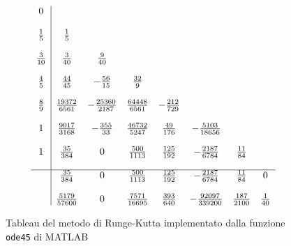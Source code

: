 \begin{figure}[htb]
$$\begin{array}{c|ccccccc}
0					&									&									&									&								&											&						&		\\ \\
\frac{1}{5}	&	\frac{1}{5}				&									&									&								&											&						&		\\ \\
\frac{3}{10}	&	\frac{3}{40}				&	\frac{9}{40}				&									&								&											&						&		\\ \\
\frac{4}{5}	&	\frac{44}{45}			&	-\frac{56}{15}			&	\frac{32}{9}				&								&											&						&		\\ \\
\frac{8}{9}	&	\frac{19372}{6561}	&	-\frac{25360}{2187}&	\frac{64448}{6561}	&	-\frac{212}{729}	&											&						&		\\ \\
1					&	\frac{9017}{3168}	&	-\frac{355}{33}		&	\frac{46732}{5247}	&	\frac{49}{176}		&	-\frac{5103}{18656}		&						&		\\ \\
1					&	\frac{35}{384}			&	0								&	\frac{500}{1113}		&	\frac{125}{192	}	&-\frac{2187}{6784}			&	\frac{11}{84}	&		\\	\\		
\hline
					&	\frac{35}{384}			&	0								&	\frac{500}{1113}		&	\frac{125}{192}	&-\frac{2187}{6784}			&	\frac{11}{84}	&	0	\\ \\
				&	\frac{5179}{57600}	&	0						&	\frac{7571}{16695}	&	\frac{393}{640}		&	-\frac{92097}{339200}	&	\frac{187}{2100}	&	\frac{1}{40}
\end{array}$$
\caption{Tableau del metodo di Runge-Kutta implementato dalla funzione \texttt{ode45} di MATLAB}
\label{fig::ode45}
\end{figure}
